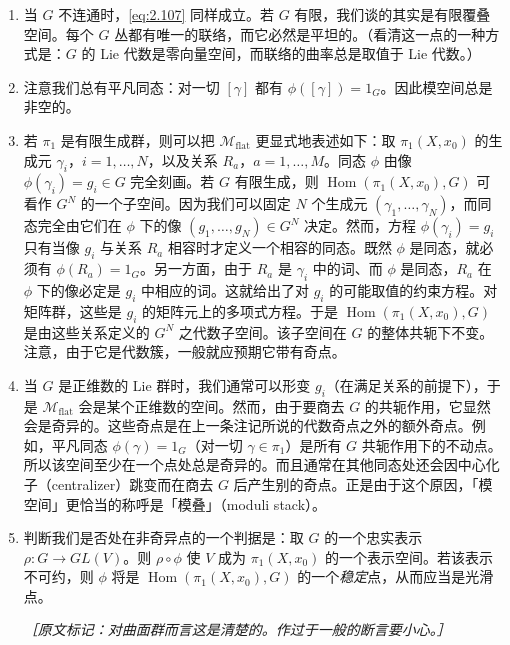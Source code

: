 \begin{enumerate}
  \item 当 $G$ 不连通时，\eqref{eq:2.107} 同样成立。若 $G$ 有限，我们谈的其实是有限覆叠空间。每个 $G$ 丛都有唯一的联络，而它必然是平坦的。（看清这一点的一种方式是：$G$ 的 Lie 代数是零向量空间，而联络的曲率总是取值于 Lie 代数。）

  \item 注意我们总有平凡同态：对一切 $[\gamma]$ 都有 $\phi([\gamma])=1_G$。因此模空间总是非空的。

  \item 若 $\pi_1$ 是有限生成群，则可以把 $\mathcal{M}_{\mathrm{flat}}$ 更显式地表述如下：取 $\pi_1(X,x_0)$ 的生成元 $\gamma_i$，$i=1,\dots,N$，以及关系 $R_a$，$a=1,\dots,M$。同态 $\phi$ 由像 $\phi(\gamma_i)=g_i\in G$ 完全刻画。若 $G$ 有限生成，则 $\operatorname{Hom}(\pi_1(X,x_0),G)$ 可看作 $G^{N}$ 的一个子空间。因为我们可以固定 $N$ 个生成元 $(\gamma_1,\dots,\gamma_N)$，而同态完全由它们在 $\phi$ 下的像 $(g_1,\dots,g_N)\in G^{N}$ 决定。然而，方程 $\phi(\gamma_i)=g_i$ 只有当像 $g_i$ 与关系 $R_a$ 相容时才定义一个相容的同态。既然 $\phi$ 是同态，就必须有 $\phi(R_a)=1_G$。另一方面，由于 $R_a$ 是 $\gamma_i$ 中的词、而 $\phi$ 是同态，$R_a$ 在 $\phi$ 下的像必定是 $g_i$ 中相应的词。这就给出了对 $g_i$ 的可能取值的约束方程。对矩阵群，这些是 $g_i$ 的矩阵元上的多项式方程。于是 $\operatorname{Hom}(\pi_1(X,x_0),G)$ 是由这些关系定义的 $G^{N}$ 之代数子空间。该子空间在 $G$ 的整体共轭下不变。注意，由于它是代数簇，一般就应预期它带有奇点。

  \item 当 $G$ 是正维数的 Lie 群时，我们通常可以形变 $g_i$（在满足关系的前提下），于是 $\mathcal{M}_{\mathrm{flat}}$ 会是某个正维数的空间。然而，由于要商去 $G$ 的共轭作用，它显然会是奇异的。这些奇点是在上一条注记所说的代数奇点之外的额外奇点。例如，平凡同态 $\phi(\gamma)=1_G$（对一切 $\gamma\in\pi_1$）是所有 $G$ 共轭作用下的不动点。所以该空间至少在一个点处总是奇异的。而且通常在其他同态处还会因中心化子（centralizer）跳变而在商去 $G$ 后产生别的奇点。正是由于这个原因，「模空间」更恰当的称呼是「模叠」（moduli stack）。

  \item 判断我们是否处在非奇异点的一个判据是：取 $G$ 的一个忠实表示 $\rho:G\to GL(V)$。则 $\rho\circ\phi$ 使 $V$ 成为 $\pi_1(X,x_0)$ 的一个表示空间。若该表示不可约，则 $\phi$ 将是 $\operatorname{Hom}(\pi_1(X,x_0),G)$ 的一个\emph{稳定}点，从而应当是光滑点。

  {\small\itshape ［原文标记：对曲面群而言这是清楚的。作过于一般的断言要小心。］}%
\end{enumerate}

